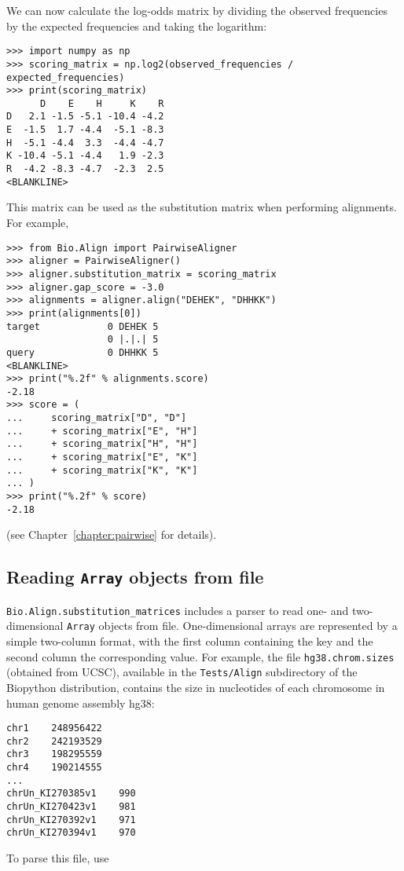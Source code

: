 We can now calculate the log-odds matrix by dividing the observed frequencies by the expected frequencies and taking the logarithm:
\begin{verbatim}
>>> import numpy as np
>>> scoring_matrix = np.log2(observed_frequencies / expected_frequencies)
>>> print(scoring_matrix)
      D    E    H     K    R
D   2.1 -1.5 -5.1 -10.4 -4.2
E  -1.5  1.7 -4.4  -5.1 -8.3
H  -5.1 -4.4  3.3  -4.4 -4.7
K -10.4 -5.1 -4.4   1.9 -2.3
R  -4.2 -8.3 -4.7  -2.3  2.5
<BLANKLINE>
\end{verbatim}

This matrix can be used as the substitution matrix when performing alignments. For example,
\begin{verbatim}
>>> from Bio.Align import PairwiseAligner
>>> aligner = PairwiseAligner()
>>> aligner.substitution_matrix = scoring_matrix
>>> aligner.gap_score = -3.0
>>> alignments = aligner.align("DEHEK", "DHHKK")
>>> print(alignments[0])
target            0 DEHEK 5
                  0 |.|.| 5
query             0 DHHKK 5
<BLANKLINE>
>>> print("%.2f" % alignments.score)
-2.18
>>> score = (
...     scoring_matrix["D", "D"]
...     + scoring_matrix["E", "H"]
...     + scoring_matrix["H", "H"]
...     + scoring_matrix["E", "K"]
...     + scoring_matrix["K", "K"]
... )
>>> print("%.2f" % score)
-2.18
\end{verbatim}
(see Chapter~\ref{chapter:pairwise} for details).

\subsection{Reading \texttt{Array} objects from file}

\verb+Bio.Align.substitution_matrices+ includes a parser to read one- and two-dimensional \verb+Array+ objects from file. One-dimensional arrays are represented by a simple two-column format, with the first column containing the key and the second column the corresponding value. For example, the file \verb+hg38.chrom.sizes+ (obtained from UCSC), available in the \verb+Tests/Align+ subdirectory of the Biopython distribution, contains the size in nucleotides of each chromosome in human genome assembly hg38:
\begin{verbatim}
chr1    248956422
chr2    242193529
chr3    198295559
chr4    190214555
...
chrUn_KI270385v1    990
chrUn_KI270423v1    981
chrUn_KI270392v1    971
chrUn_KI270394v1    970
\end{verbatim}
To parse this file, use

